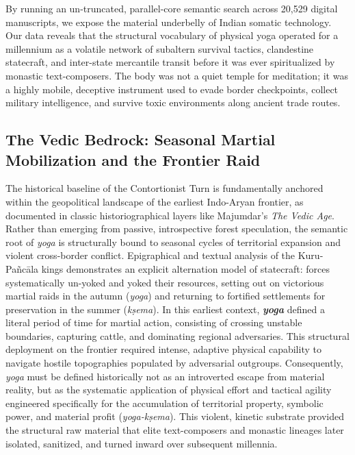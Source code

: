 \documentclass[11pt,letterpaper]{article}
\begin{document}
By running an un-truncated, parallel-core semantic search across 20,529 digital manuscripts, we expose the material underbelly of Indian somatic technology. Our data reveals that the structural vocabulary of physical yoga operated for a millennium as a volatile network of subaltern survival tactics, clandestine statecraft, and inter-state mercantile transit before it was ever spiritualized by monastic text-composers. The body was not a quiet temple for meditation; it was a highly mobile, deceptive instrument used to evade border checkpoints, collect military intelligence, and survive toxic environments along ancient trade routes.

\subsection{The Vedic Bedrock: Seasonal Martial Mobilization and the Frontier Raid}
The historical baseline of the Contortionist Turn is fundamentally anchored within the geopolitical landscape of the earliest Indo-Aryan frontier, as documented in classic historiographical layers like Majumdar’s \textit{The Vedic Age}. Rather than emerging from passive, introspective forest speculation, the semantic root of \textit{yoga} is structurally bound to seasonal cycles of territorial expansion and violent cross-border conflict. Epigraphical and textual analysis of the Kuru-Pañcāla kings demonstrates an explicit alternation model of statecraft: forces systematically un-yoked and yoked their resources, setting out on victorious martial raids in the autumn (\textit{yoga}) and returning to fortified settlements for preservation in the summer (\textit{kṣema}). In this earliest context, \textbf{\textit{yoga}} defined a literal period of time for martial action, consisting of crossing unstable boundaries, capturing cattle, and dominating regional adversaries. This structural deployment on the frontier required intense, adaptive physical capability to navigate hostile topographies populated by adversarial outgroups. Consequently, \textit{yoga} must be defined historically not as an introverted escape from material reality, but as the systematic application of physical effort and tactical agility engineered specifically for the accumulation of territorial property, symbolic power, and material profit (\textit{yoga-kṣema}). This violent, kinetic substrate provided the structural raw material that elite text-composers and monastic lineages later isolated, sanitized, and turned inward over subsequent millennia.
\end{document}
